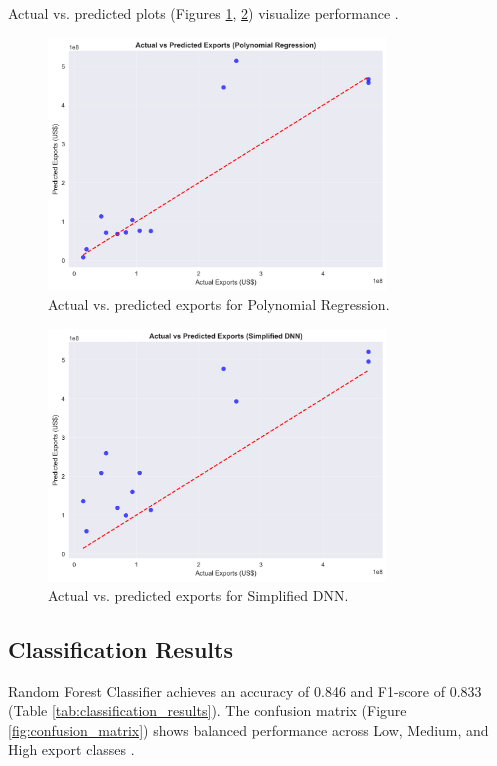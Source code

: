 \documentclass[12pt]{article}
\begin{document}
	Actual vs. predicted plots (Figures \ref{fig:poly_pred}, \ref{fig:dnn_pred}) visualize performance \citep{hunter2007}.
	
	\begin{figure}[H]
		\centering
		\includegraphics[width=0.8\textwidth]{../figures/actual_vs_predicted_polynomial_regression.png}
		\caption{Actual vs. predicted exports for Polynomial Regression.}
		\label{fig:poly_pred}
	\end{figure}
	
	\begin{figure}[H]
		\centering
		\includegraphics[width=0.8\textwidth]{../figures/actual_vs_predicted_dnn.png}
		\caption{Actual vs. predicted exports for Simplified DNN.}
		\label{fig:dnn_pred}
	\end{figure}
	
	\subsection{Classification Results}
	Random Forest Classifier achieves an accuracy of 0.846 and F1-score of 0.833 (Table \ref{tab:classification_results}). The confusion matrix (Figure \ref{fig:confusion_matrix}) shows balanced performance across Low, Medium, and High export classes \citep{hastie2009}.
	
\end{document}
